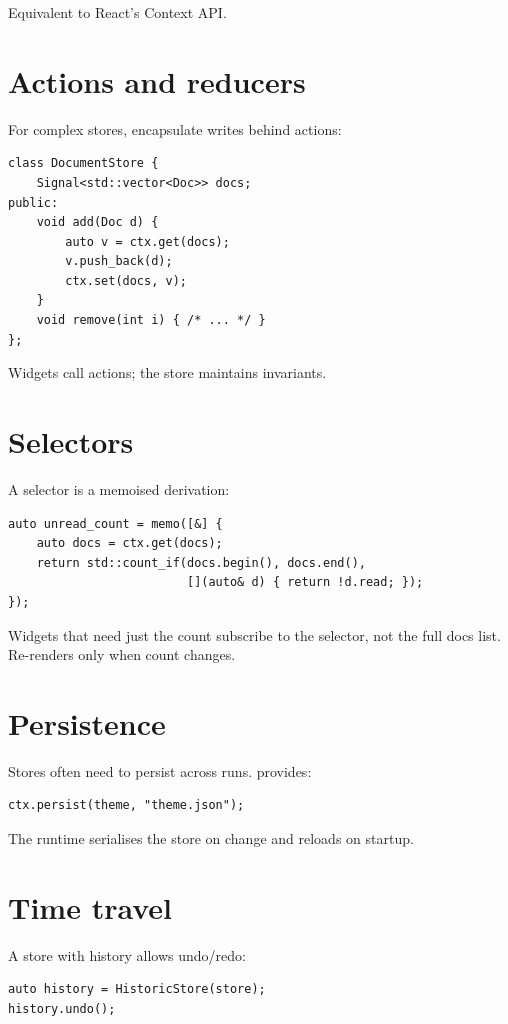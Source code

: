Equivalent to React's Context API.

\section{Actions and reducers}

For complex stores, encapsulate writes behind actions:

\begin{lstlisting}
class DocumentStore {
    Signal<std::vector<Doc>> docs;
public:
    void add(Doc d) {
        auto v = ctx.get(docs);
        v.push_back(d);
        ctx.set(docs, v);
    }
    void remove(int i) { /* ... */ }
};
\end{lstlisting}

Widgets call actions; the store maintains invariants.

\section{Selectors}

A selector is a memoised derivation:

\begin{lstlisting}
auto unread_count = memo([&] {
    auto docs = ctx.get(docs);
    return std::count_if(docs.begin(), docs.end(),
                         [](auto& d) { return !d.read; });
});
\end{lstlisting}

Widgets that need just the count subscribe to the selector,
not the full docs list. Re-renders only when count changes.

\section{Persistence}

Stores often need to persist across runs. \maya{} provides:

\begin{lstlisting}
ctx.persist(theme, "theme.json");
\end{lstlisting}

The runtime serialises the store on change and reloads on
startup.

\section{Time travel}

A store with history allows undo/redo:

\begin{lstlisting}
auto history = HistoricStore(store);
history.undo();
\end{lstlisting}

